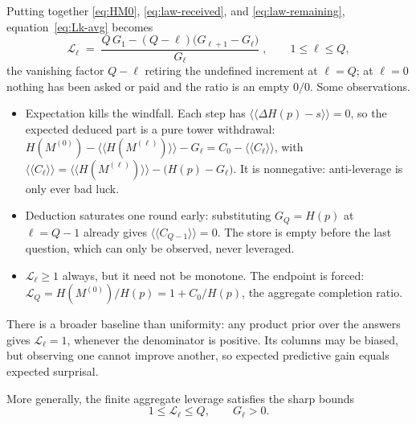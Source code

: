 \documentclass[11pt]{article}
\begin{document}
Putting together \eqref{eq:HM0}, \eqref{eq:law-received}, and \eqref{eq:law-remaining}, equation~\eqref{eq:Lk-avg} becomes
\begin{equation}\label{eq:Lk-G}
  \mathcal L_\ell \;=\;
  \frac{Q\,G_1 - (Q - \ell)\big(G_{\ell+1} - G_\ell\big)}
       {G_\ell}\;,
  \qquad 1 \le \ell \le Q,
\end{equation}
the vanishing factor $Q - \ell$ retiring the undefined increment at
$\ell = Q$; at $\ell = 0$ nothing has been asked or paid and the
ratio is an empty $0/0$.
Some observations.
\begin{itemize}
  \item Expectation kills the windfall. Each step has
    $\langle\!\langle \Delta H(p) - s \rangle\!\rangle = 0$, so the expected deduced
    part is a pure tower withdrawal:
    $H(M^{(0)}) - \langle\!\langle H(M^{(\ell)}) \rangle\!\rangle - G_\ell
    = C_0 - \langle\!\langle C_\ell \rangle\!\rangle$, with
    $\langle\!\langle C_\ell \rangle\!\rangle =
    \langle\!\langle H(M^{(\ell)}) \rangle\!\rangle - \big(H(p) - G_\ell\big)$. It
    is nonnegative: anti-leverage is only ever bad luck.
  \item Deduction saturates one round early: substituting
    $G_{Q} = H(p)$ at $\ell = Q - 1$ already gives
    $\langle\!\langle C_{Q - 1} \rangle\!\rangle = 0$. The store is empty before
    the last question, which can only be observed, never
    leveraged.
  \item $\mathcal L_\ell \geq 1$ always, but it need not be
    monotone. The endpoint is forced:
    $\mathcal L_{Q} = H(M^{(0)}) / H(p) = 1 + C_0/H(p)$, the
    aggregate completion ratio.
\end{itemize}

There is a broader baseline than uniformity: any product prior over
the answers gives $\mathcal L_\ell=1$, whenever the denominator is
positive. Its columns may be biased, but observing one cannot improve
another, so expected predictive gain equals expected surprisal.

More generally, the finite aggregate leverage satisfies the sharp bounds
\begin{equation}\label{eq:leverage-bounds}
  1\leq\mathcal L_\ell\leq Q,\qquad G_\ell>0.
\end{equation}
\end{document}
